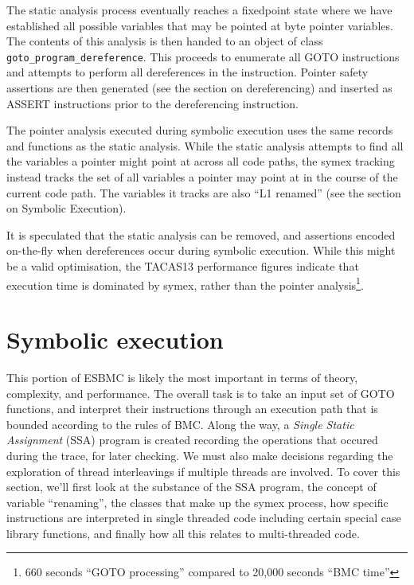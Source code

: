 \documentclass{article}
\begin{document}
The static analysis process eventually reaches a fixedpoint state where we
have established all possible variables that may be pointed at byte pointer
variables. The contents of this analysis is then handed to an object of
class \texttt{goto\_program\_dereference}. This proceeds to enumerate all
GOTO instructions and attempts to perform all dereferences in the instruction.
Pointer safety assertions are then generated (see the section on dereferencing)
and inserted as ASSERT instructions prior to the dereferencing instruction.

The pointer analysis executed during symbolic execution uses the same records
and functions as the static analysis. While the static analysis attempts to find
all the variables a pointer might point at across all code paths, the symex
tracking instead tracks the set of all variables a pointer may point at in the
course of the current code path. The variables it tracks are also ``L1 renamed''
(see the section on Symbolic Execution).

It is speculated that the static analysis can be removed, and assertions
encoded on-the-fly when dereferences occur during symbolic execution. While
this might be a valid optimisation, the TACAS13 performance figures indicate
that execution time is dominated by symex, rather than the pointer
analysis\footnote{660 seconds ``GOTO processing'' compared to 20,000 seconds
``BMC time''}.

\section{Symbolic execution}

This portion of ESBMC is likely the most important in terms of theory,
complexity, and performance. The overall task is to take an input set of
GOTO functions, and interpret their instructions through an execution path
that is bounded according to the rules of BMC. Along the way, a \textit{Single
Static Assignment} (SSA) program is created recording the operations that
occured during the trace, for later checking. We must also make decisions
regarding the exploration of thread interleavings if multiple threads are
involved. To cover this section, we'll first look at the substance of the
SSA program, the concept of variable ``renaming'', the classes that make up
the symex process, how specific instructions are interpreted in single
threaded code including certain special case library functions,
and finally how all this relates to multi-threaded code.
\end{document}
